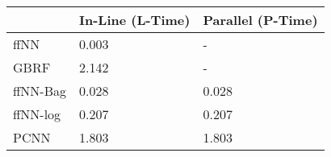 \begin{tabular}{lll}
\toprule
{} & In-Line (L-Time) & Parallel (P-Time) \\
\midrule
ffNN     &            0.003 &                 - \\
GBRF     &            2.142 &                 - \\
ffNN-Bag &            0.028 &             0.028 \\
ffNN-log &            0.207 &             0.207 \\
PCNN     &            1.803 &             1.803 \\
\bottomrule
\end{tabular}
